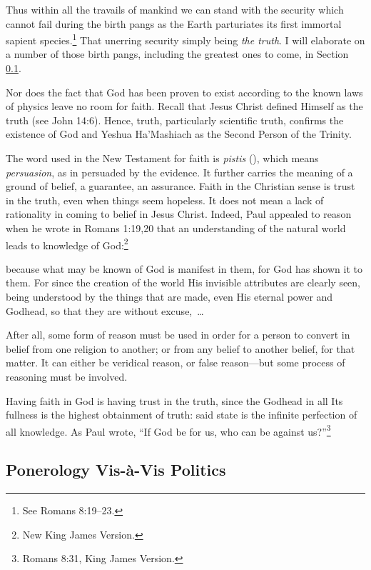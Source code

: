 \documentclass[letterpaper,12pt]{article}
\newenvironment{squote}
  {\small\quote}
  {\endquote\normalsize}
\begin{document}
Thus within all the travails of mankind we can stand with the security which cannot fail during the birth pangs as the Earth parturiates its first immortal sapient species.\footnote{See Romans 8:19--23.} That unerring security simply being \emph{the truth}. I will elaborate on a number of those birth pangs, including the greatest ones to come, in Section \ref{subsec:PonerologyVisAVisPolitics}.

Nor does the fact that God has been proven to exist according to the known laws of physics leave no room for faith. Recall that Jesus Christ defined Himself as the truth (see John 14:6). Hence, truth, particularly scientific truth, confirms the existence of God and Yeshua Ha'Mashiach as the Second Person of the Trinity.

The word used in the New Testament for faith is \emph{pistis} (), which means \emph{persuasion}, as in persuaded by the evidence. It further carries the meaning of a ground of belief, a guarantee, an assurance. Faith in the Christian sense is trust in the truth, even when things seem hopeless. It does not mean a lack of rationality in coming to belief in Jesus Christ. Indeed, Paul appealed to reason when he wrote in Romans 1:19,20 that an understanding of the natural world leads to knowledge of God:\footnote{New King James Version.}

\begin{squote}
because what may be known of God is manifest in them, for God has shown it to them. For since the creation of the world His invisible attributes are clearly seen, being understood by the things that are made, even His eternal power and Godhead, so that they are without excuse,~\ldots
\end{squote}

After all, some form of reason must be used in order for a person to convert in belief from one religion to another; or from any belief to another belief, for that matter. It can either be veridical reason, or false reason---but some process of reasoning must be involved.

Having faith in God is having trust in the truth, since the Godhead in all Its fullness is the highest obtainment of truth: said state is the infinite perfection of all knowledge. As Paul wrote, ``If God be for us, who can be against us?''\footnote{Romans 8:31, King James Version.}

\subsection{Ponerology Vis-\`a-Vis Politics}
\label{subsec:PonerologyVisAVisPolitics}
\end{document}
